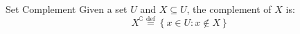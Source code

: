 \documentclass{standalone}
\begin{document}
\begin{defn*}{Set Complement}
Given a set $U$ and $X \subseteq U$, the complement of $X$ is:
\[
	X ^{\complement} \stackrel{\text{def}}{=} \left\{ x \in U: x \not\in X \right\}
\]
\end{defn*}
\end{document}
